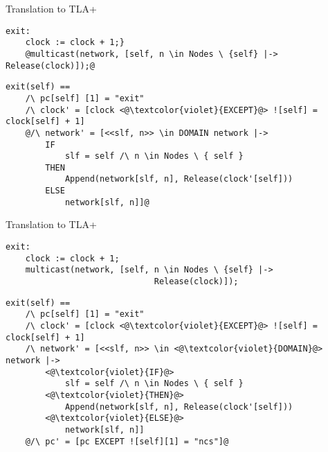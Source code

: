 \documentclass{beamer}
\begin{document}
\begin{frame}[fragile]{Translation to TLA+}
 \begin{lstlisting}[language=pluscal, frame = tlrb, numbers=none]  
 exit:  
    clock := clock + 1;}
    @multicast(network, [self, n \in Nodes \ {self} |->                 Release(clock)]);@
\end{lstlisting}


\begin{lstlisting}[language=pluscal, frame = tlrb, numbers=none]  
exit(self) == 
    /\ pc[self] [1] = "exit"
    /\ clock' = [clock <@\textcolor{violet}{EXCEPT}@> ![self] = clock[self] + 1]
    @/\ network' = [<<slf, n>> \in DOMAIN network |->
        IF
            slf = self /\ n \in Nodes \ { self } 
        THEN
            Append(network[slf, n], Release(clock'[self])) 
        ELSE
            network[slf, n]]@
\end{lstlisting}
\end{frame}

\begin{frame}[fragile]{Translation to TLA+}
 \begin{lstlisting}[language=pluscal, frame = tlrb, numbers=none]  
 exit:  
    clock := clock + 1;
    multicast(network, [self, n \in Nodes \ {self} |->
                              Release(clock)]);
\end{lstlisting}


\begin{lstlisting}[language=pluscal, frame = tlrb, numbers=none]  
exit(self) == 
    /\ pc[self] [1] = "exit"
    /\ clock' = [clock <@\textcolor{violet}{EXCEPT}@> ![self] = clock[self] + 1]
    /\ network' = [<<slf, n>> \in <@\textcolor{violet}{DOMAIN}@> network |->
        <@\textcolor{violet}{IF}@> 
            slf = self /\ n \in Nodes \ { self } 
        <@\textcolor{violet}{THEN}@> 
            Append(network[slf, n], Release(clock'[self])) 
        <@\textcolor{violet}{ELSE}@>
            network[slf, n]]
    @/\ pc' = [pc EXCEPT ![self][1] = "ncs"]@
\end{lstlisting}
\end{frame}
\end{document}
